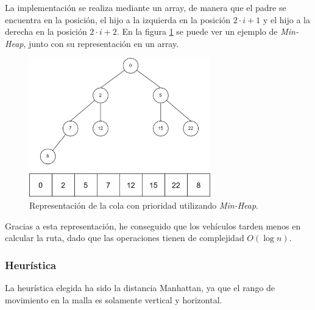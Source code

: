\bigskip

La implementación se realiza mediante un array, de manera que el padre se encuentra en la posición, el hijo a la izquierda en la posición $2 \cdot i + 1$ y el hijo a la derecha en la posición $2 \cdot i + 2$. En la figura \ref{fig:minheaparray} se puede ver un ejemplo de \textit{Min-Heap}, junto con su representación en un array.

\begin{figure}[H]
    \centering
    \includegraphics[width=0.7\textwidth]{imagenes/minheap.png}
    \caption{Representación de la cola con prioridad utilizando \textit{Min-Heap}.}
    \label{fig:minheaparray}
\end{figure}

Gracias a esta representación, he conseguido que los vehículos tarden menos en calcular la ruta, dado que las operaciones tienen de complejidad $O(\log n)$.

\subsubsection{Heurística}




La heurística elegida ha sido la distancia Manhattan, ya que el rango de movimiento en la malla es solamente vertical y horizontal.

